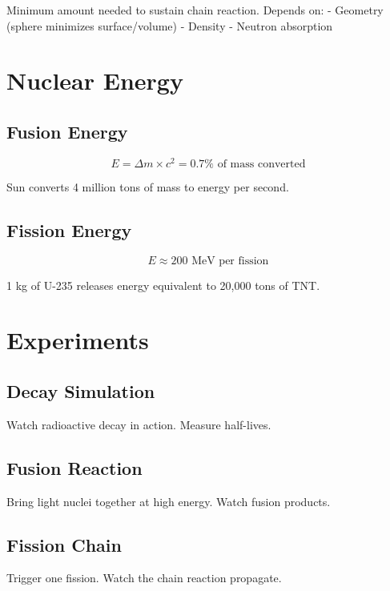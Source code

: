 \documentclass[
  11pt,
  letterpaper,
  twoside,
  openright]{book}
\begin{document}
Minimum amount needed to sustain chain reaction. Depends on: - Geometry
(sphere minimizes surface/volume) - Density - Neutron absorption

\section{Nuclear Energy}\label{nuclear-energy}

\subsection{Fusion Energy}\label{fusion-energy}

\[
E = \Delta m \times c^2 = 0.7\% \text{ of mass converted}
\]

Sun converts 4 million tons of mass to energy per second.

\subsection{Fission Energy}\label{fission-energy}

\[
E \approx 200 \text{ MeV per fission}
\]

1 kg of U-235 releases energy equivalent to 20,000 tons of TNT.

\section{Experiments}\label{experiments-3}

\subsection{Decay Simulation}\label{decay-simulation}

Watch radioactive decay in action. Measure half-lives.

\subsection{Fusion Reaction}\label{fusion-reaction}

Bring light nuclei together at high energy. Watch fusion products.

\subsection{Fission Chain}\label{fission-chain}

Trigger one fission. Watch the chain reaction propagate.
\end{document}
